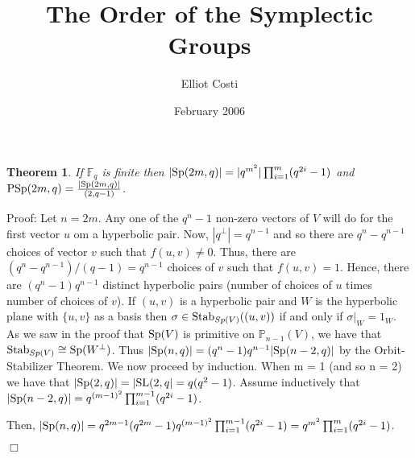 \documentclass[12pt]{article}
\newtheorem{theorem}[definition]{Theorem}
\newenvironment{proof}{\normalsize {\sc Proof}:}{{\hfill $\Box$ \\}}
\def\SL{{\rm SL}}
\def\PSp{{\rm PSp}}
\def\Stab{{\rm Stab}}
\def\Sp{{\rm Sp}}
\begin{document}
\title{The Order of the Symplectic Groups} 
\author{Elliot Costi}
\date{February 2006}
\maketitle

\section{}
\label{}

\begin{theorem}
If $\mathbb{F}_q$ is finite then $|\Sp(2m, q)|=|q^{m^2}|\prod^{m}_{i=1}(q^{2i}-1)$ and $\PSp(2m, q) = \frac{|\Sp(2m, q)|}{(2, q-1)}$.
\end{theorem}

\begin{proof}
Let $n = 2m$. Any one of the $q^n - 1$ non-zero vectors of $V$ will do for the first vector $u$ om a hyperbolic pair. Now, $|q^\perp| = q^{n-1}$ and so there are $q^n - q^{n-1}$ choices of vector $v$ such that $f(u, v) \ne 0$. Thus, there are $(q^n - q^{n-1})/(q-1) = q^{n-1}$ choices of $v$ such that $f(u, v)=1$. Hence, there are $(q^n - 1)q^{n-1}$ distinct hyperbolic pairs (number of choices of $u$ times number of choices of $v$). If $(u, v)$ is a hyperbolic pair and $W$ is the hyperbolic plane with $\{u, v\}$ as a basis then $\sigma \in \Stab_{Sp(V)}((u, v))$ if and only if $\sigma|_W = 1_W$. As we saw in the proof that $\Sp(V)$ is primitive on $\mathbb{P}_{n-1}(V)$, we have that $\Stab_{Sp(V)} \cong \Sp(W^\perp)$. Thus $|\Sp(n, q)| = (q^n-1)q^{n-1} |\Sp(n-2, q)|$ by the Orbit-Stabilizer Theorem. We now proceed by induction. When m = 1 (and so n = 2) we have that $|\Sp(2, q)| = |\SL(2, q| = q(q^2 - 1)$. Assume inductively that $|\Sp(n - 2, q)| = q^{(m-1)^2} \prod^{m-1}_{i=1}(q^{2i}-1)$.

Then, $|\Sp(n, q)| = q^{2m-1} (q^{2m} - 1) q^{(m-1)^2} \prod^{m-1}_{i=1} (q^{2i}-1) = q^{m^2}\prod^{m}_{i=1}(q^{2i}-1)$.

\end{proof}
\end{document}
